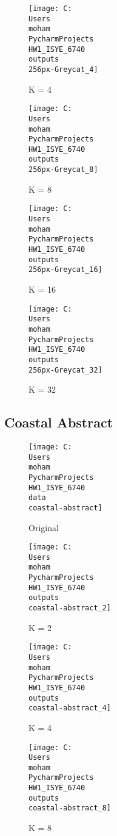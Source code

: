 \documentclass[twoside,10pt]{article}
\begin{document}
\begin{figure}
    \centering
    \texttt{[image: C:\\Users\\moham\\PycharmProjects\\HW1\_ISYE\_6740\\outputs\\256px-Greycat\_4]}
    \caption{K = 4}
    \label{fig:256px-greycat_4}
\end{figure}

\begin{figure}
    \centering
    \texttt{[image: C:\\Users\\moham\\PycharmProjects\\HW1\_ISYE\_6740\\outputs\\256px-Greycat\_8]}
    \caption{K = 8}
    \label{fig:256px-greycat_8}
\end{figure}

\begin{figure}
    \centering
    \texttt{[image: C:\\Users\\moham\\PycharmProjects\\HW1\_ISYE\_6740\\outputs\\256px-Greycat\_16]}
    \caption{K = 16}
    \label{fig:256px-greycat_16}
\end{figure}

\begin{figure}
    \centering
    \texttt{[image: C:\\Users\\moham\\PycharmProjects\\HW1\_ISYE\_6740\\outputs\\256px-Greycat\_32]}
    \caption{K = 32}
    \label{fig:256px-greycat_32}
\end{figure}


\subsection{Coastal Abstract}

\begin{figure}
    \centering
    \texttt{[image: C:\\Users\\moham\\PycharmProjects\\HW1\_ISYE\_6740\\data\\coastal-abstract]}
    \caption{Original}
    \label{fig:coastal-abstract}
\end{figure}

\begin{figure}
    \centering
    \texttt{[image: C:\\Users\\moham\\PycharmProjects\\HW1\_ISYE\_6740\\outputs\\coastal-abstract\_2]}
    \caption{K = 2}
    \label{fig:coastal-abstract_2}
\end{figure}

\begin{figure}
    \centering
    \texttt{[image: C:\\Users\\moham\\PycharmProjects\\HW1\_ISYE\_6740\\outputs\\coastal-abstract\_4]}
    \caption{K = 4}
    \label{fig:coastal-abstract_4}
\end{figure}

\begin{figure}
    \centering
    \texttt{[image: C:\\Users\\moham\\PycharmProjects\\HW1\_ISYE\_6740\\outputs\\coastal-abstract\_8]}
    \caption{K = 8}
    \label{fig:coastal-abstract_8}
\end{figure}
\end{document}
